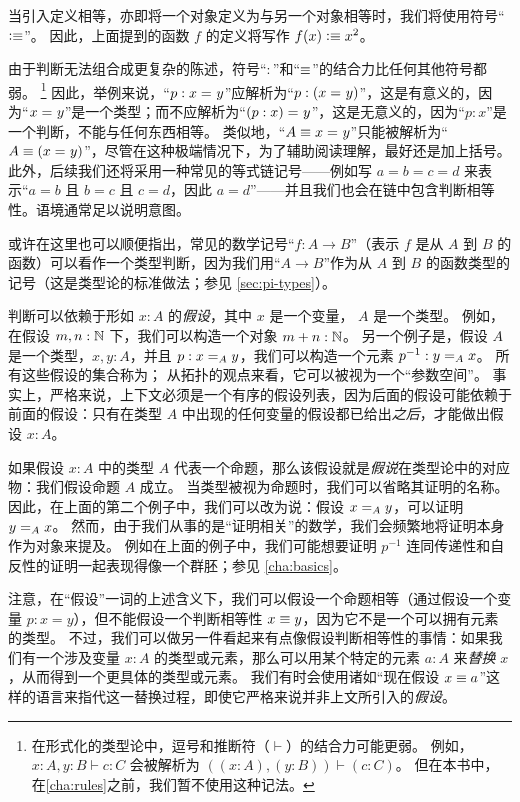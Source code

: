 %
%
当引入定义相等，亦即将一个对象定义为与另一个对象相等时，我们将使用符号``$\defeq$''。
因此，上面提到的函数 $f$ 的定义将写作 $f(x)\defeq x^2$。

由于判断无法组合成更复杂的陈述，符号``$:$''和``$\jdeq$''的结合力比任何其他符号都弱。%
\footnote{在形式化的类型论中，逗号和推断符（$\vdash$）的结合力可能更弱。
  例如，$x:A,y:B\vdash c:C$ 会被解析为 $((x:A),(y:B))\vdash (c:C)$。
  但在本书中，在\cref{cha:rules}之前，我们暂不使用这种记法。}
因此，举例来说，``$p:\id{x}{y}$''应解析为``$p:(\id{x}{y})$''，这是有意义的，因为``$\id{x}{y}$''是一个类型；而不应解析为``$\id{(p:x)}{y}$''，这是无意义的，因为``$p:x$''是一个判断，不能与任何东西相等。
类似地，``$A\jdeq \id{x}{y}$''只能被解析为``$A\jdeq(\id{x}{y})$''，尽管在这种极端情况下，为了辅助阅读理解，最好还是加上括号。
此外，后续我们还将采用一种常见的等式链记号——例如写 $a=b=c=d$ 来表示``$a=b$ 且 $b=c$ 且 $c=d$，因此 $a=d$''——并且我们也会在链中包含判断相等性。语境通常足以说明意图。

或许在这里也可以顺便指出，常见的数学记号``$f:A\to B$''（表示 $f$ 是从 $A$ 到 $B$ 的函数）可以看作一个类型判断，因为我们用``$A\to B$''作为从 $A$ 到 $B$ 的函数类型的记号（这是类型论的标准做法；参见 \cref{sec:pi-types}）。

%
判断可以依赖于形如 $x:A$ 的\emph{假设}，其中 $x$ 是一个变量，%
$A$ 是一个类型。
例如，在假设 $m,n : \nat$ 下，我们可以构造一个对象 $m + n : \nat$。
另一个例子是，假设 $A$ 是一个类型，$x,y : A$，并且 $p : \id[A]{x}{y}$，我们可以构造一个元素 $p^{-1} : \id[A]{y}{x}$。
所有这些假设的集合称为；%
从拓扑的观点来看，它可以被视为一个``参数空间''。
事实上，严格来说，上下文必须是一个有序的假设列表，因为后面的假设可能依赖于前面的假设：只有在类型 $A$ 中出现的任何变量的假设都已给出\emph{之后}，才能做出假设 $x:A$。

如果假设 $x:A$ 中的类型 $A$ 代表一个命题，那么该假设就是\emph{假说}在类型论中的对应物：我们假设命题 $A$ 成立。
当类型被视为命题时，我们可以省略其证明的名称。
因此，在上面的第二个例子中，我们可以改为说：假设 $\id[A]{x}{y}$，可以证明 $\id[A]{y}{x}$。
然而，由于我们从事的是``证明相关''的数学，我们会频繁地将证明本身作为对象来提及。
例如在上面的例子中，我们可能想要证明 $p^{-1}$ 连同传递性和自反性的证明一起表现得像一个群胚；参见 \cref{cha:basics}。

注意，在``假设''一词的上述含义下，我们可以假设一个命题相等（通过假设一个变量 $p:x=y$），但不能假设一个判断相等性 $x\jdeq y$，因为它不是一个可以拥有元素的类型。
不过，我们可以做另一件看起来有点像假设判断相等性的事情：如果我们有一个涉及变量 $x:A$ 的类型或元素，那么可以用某个特定的元素 $a:A$ 来\emph{替换} $x$，从而得到一个更具体的类型或元素。
我们有时会使用诸如``现在假设 $x\jdeq a$''这样的语言来指代这一替换过程，即使它严格来说并非上文所引入的\emph{假设}。
%

